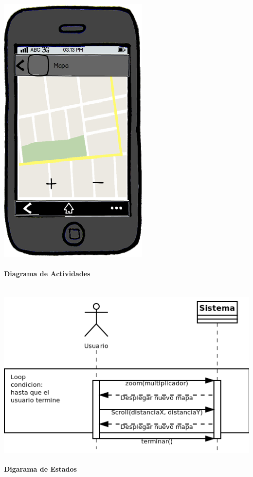 \documentclass[12pt]{article}
\begin{document}
\includegraphics[scale=0.5]{"../Documentos/Diagramas/MockupMapa"}

\newpage
\paragraph{Diagrama de Actividades}\ \\

\includegraphics[width=\linewidth]{"../Documentos/Diagramas/CU1_Actividades"}


\paragraph{Digarama de Estados}\ \\
\end{document}
